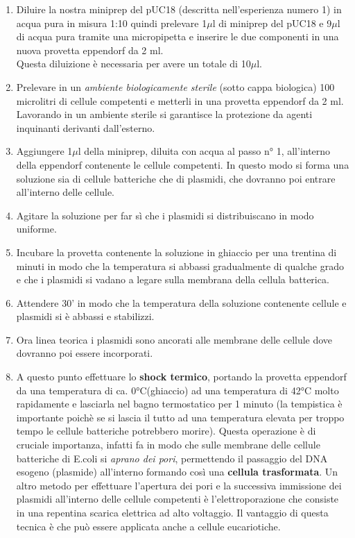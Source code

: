 \begin{enumerate}
	\item Diluire la nostra miniprep del pUC18 (descritta nell'esperienza numero 1)
  in acqua pura in misura 1:10 quindi prelevare 1$\mu$l di miniprep del pUC18 e
  9$\mu$l di acqua pura tramite una micropipetta e inserire le due componenti
  in una nuova provetta eppendorf da 2 ml. \\
  Questa diluizione \`e necessaria per avere un totale di 10$\mu$l.


	\item Prelevare in un \textit{ambiente biologicamente sterile} (sotto cappa biologica) 100 microlitri
  di cellule competenti e metterli in una provetta eppendorf da 2 ml.
  Lavorando in un ambiente sterile si garantisce la protezione da agenti inquinanti derivanti dall’esterno.

	\item Aggiungere 1$\mu$l della miniprep, diluita con acqua al passo n° 1,
  all'interno della eppendorf contenente le cellule competenti.
  In questo modo si forma una soluzione sia di cellule batteriche che di plasmidi,
  che dovranno poi entrare all'interno delle cellule.

	\item Agitare la soluzione per far s\`i che i plasmidi si distribuiscano in
  modo uniforme.
  \item Incubare la provetta contenente la soluzione in ghiaccio per una trentina di minuti
  in modo che la temperatura si abbassi gradualmente di qualche grado e che i plasmidi
  si vadano a legare sulla membrana della cellula batterica.

	\item Attendere 30' in modo che la temperatura della soluzione contenente cellule e plasmidi si è abbassi
  e stabilizzi.
  \item Ora linea teorica i plasmidi sono ancorati alle membrane delle cellule dove dovranno poi essere
  incorporati.
  \item A questo punto effettuare lo \textbf{shock termico}, portando la provetta eppendorf
  da una temperatura di ca. 0°C(ghiaccio) ad una temperatura di 42°C  molto rapidamente e lasciarla
  nel bagno termostatico per 1 minuto (la tempistica è importante poichè se si lascia il tutto ad una
  temperatura elevata per troppo tempo le cellule batteriche potrebbero morire).
  Questa operazione \`e di cruciale importanza, infatti fa in modo che sulle membrane delle cellule batteriche
  di E.coli si \textit{aprano dei pori}, permettendo il passaggio del DNA esogeno (plasmide) all'interno
  formando così una \textbf{cellula trasformata}.
	Un altro metodo per effettuare l'apertura dei pori e la successiva immissione dei plasmidi all'interno
  delle cellule competenti è l'elettroporazione che consiste in una repentina scarica elettrica
  ad alto voltaggio. Il vantaggio di questa tecnica \`e che può essere applicata anche a cellule eucariotiche.


\end{enumerate}
